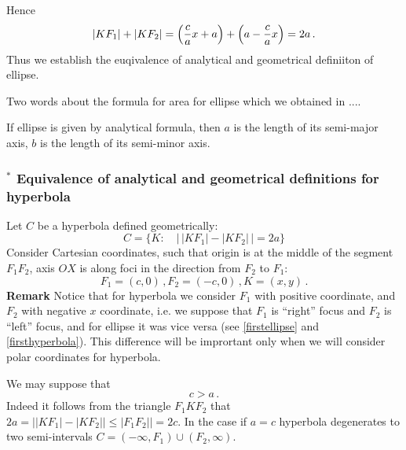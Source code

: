 \documentclass[12pt]{article}
\numberwithin{equation}{section}
\begin{document}
Hence
       $$
     |KF_1|+|KF_2|=
     \left({c\over a}x+a\right)+
     \left(a-{c\over a}x\right)=2a\,.
       $$
Thus we establish the euqivalence of 
analytical and geometrical definiiton of ellipse.

Two words about the formula for area for ellipse
 which we obtained in ....


 If ellipse is given by analytical formula,
then $a$ is the length of its semi-major axis,
$b$ is the length of its semi-minor axis. 

\subsubsection {$^*$ Equivalence of analytical and 
geometrical definitions for hyperbola}

{\footnotesize  Let $C$ be a hyperbola  defined geometrically:
         \begin{equation}\label{geomhyp2}
C=\{K\colon\quad \left|\,\left|KF_1\right|-
\left|KF_2\right|\,\right|=2a\}
           \end{equation}
Consider Cartesian coordinates, such that
origin is at the middle of the segment $F_1F_2$,
axis $OX$ is along foci in the direction from $F_2$
to $F_1$:
      $$
F_1=(c,0)\,, F_2=(-c,0)\,,  K=(x,y)\,.
      $$
{\bf Remark} Notice that for hyperbola we 
consider $F_1$
with positive coordinate, and $F_2$ with negative
  $x$ coordinate, i.e. 
 we suppose that $F_1$ is ``right'' focus and
$F_2$  is ``left'' focus, and for ellipse it
was vice versa (see \eqref{firstellipse} and 
\eqref{firsthyperbola}). This difference will be imprortant
only when we will consider polar coordinates for hyperbola.


 

We may suppose that
    \begin{equation}\label{hyperbolainequality}
        c>a\,.
    \end{equation}
     Indeed it follows from the triangle $F_1KF_2$ that
$2a=\left||KF_1|-|KF_2||\leq  |F_1F_2|\right|=2c$.
In the case if $a=c$ hyperbola  degenerates to 
two semi-intervals
$C=(-\infty, F_1)\cup (F_2, \infty)$.

}
\end{document}

